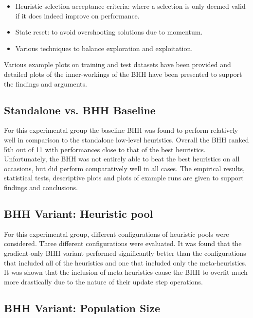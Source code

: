 \begin{itemize}
	\item {}Heuristic selection acceptance criteria: where a selection is only deemed valid if it does indeed improve on performance.

	\item State reset: to avoid overshooting solutions due to momentum.

	\item Various techniques to balance exploration and exploitation.
\end{itemize}

Various example plots on training and test datasets have been provided and detailed plots of the inner-workings of the \ac{BHH} have been presented to support the findings and arguments.

\subsection{Standalone vs. \ac{BHH} Baseline}
\label{sec:conclusion:results:summary:standalone}

For this experimental group the baseline \ac{BHH} was found to perform relatively well in comparison to the standalone low-level heuristics. Overall the \ac{BHH} ranked 5th out of 11 with performances close to that of the best heuristics. Unfortunately, the \ac{BHH} was not entirely able to beat the best heuristics on all occasions, but did perform comparatively well in all cases. The empirical results, statistical tests, descriptive plots and plots of example runs are given to support findings and conclusions.

\subsection{\ac{BHH} Variant: Heuristic pool}
\label{sec:conclusion:results:summary:heuristic_pool}

For this experimental group, different configurations of heuristic pools were considered. Three different configurations were evaluated. It was found that the gradient-only \ac{BHH} variant performed significantly better than the configurations that included all of the heuristics and one that included only the meta-heuristics. It was shown that the inclusion of meta-heuristics cause the \ac{BHH} to overfit much more drastically due to the nature of their update step operations.

\subsection{\ac{BHH} Variant: Population Size}
\label{sec:conclusion:results:summary:population_size}

